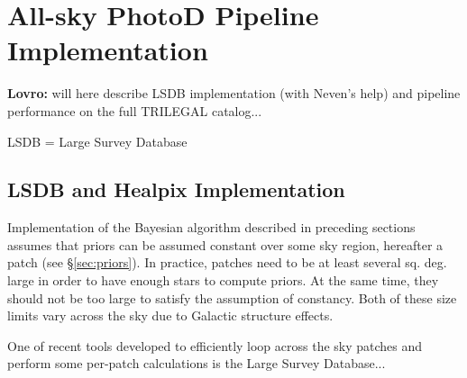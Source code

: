 

\section{All-sky PhotoD Pipeline Implementation \label{sec:LSDBpipe}}


{\bf Lovro:} will here describe LSDB implementation (with Neven's help) and pipeline performance on the full TRILEGAL catalog...

LSDB = Large Survey Database 


\subsection{LSDB and Healpix Implementation} 

Implementation of the Bayesian algorithm described in preceding sections assumes that priors can be assumed constant
over some sky region, hereafter a patch (see \S\ref{sec:priors}). In practice,  patches need to be at least several sq. deg.
large in order to have enough stars to compute priors. At the same time, they should not be too large to satisfy the assumption
of constancy. Both of these size limits vary across the sky due to Galactic structure effects. 

One of recent tools developed to efficiently loop across the sky patches and perform some per-patch calculations
is the  Large Survey Database...
 